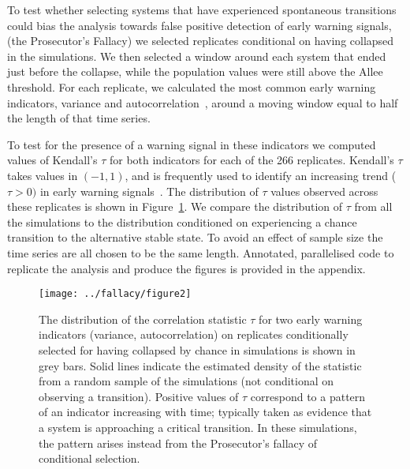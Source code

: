 To test whether selecting systems that have experienced
spontaneous transitions could bias the analysis towards false
positive detection of early warning signals, (the Prosecutor's
Fallacy) we selected replicates conditional on having collapsed
in the simulations.  We then selected a window around each system
that ended just before the collapse, while the population values
were still above the Allee threshold.  For each replicate, we
calculated the most common early warning indicators, variance and
autocorrelation~\citep[\emph{e.g.}][]{Carpenter2006,Dakos2008,Scheffer2009},
around a moving window equal to half the length of that time series.


To test for the presence of a warning signal in these indicators we
computed values of Kendall's $\tau$ for both indicators for each of
the 266 replicates.  Kendall's $\tau$ takes values in $(-1, 1)$, and is
frequently used to identify an increasing trend ($\tau > 0 )$ in early
warning signals~\citep{Dakos2008, Dakos2011}.  The distribution
of $\tau$ values observed across these replicates is shown in
Figure~\ref{fig:indicator}.   
We compare the distribution of $\tau$ from all the simulations to
the distribution conditioned on experiencing a chance transition to the
alternative stable state.  To avoid an effect of sample size the time series are all chosen
to be the same length.  
Annotated, parallelised code to replicate the analysis
and produce the figures is provided in the appendix. 

\begin{figure}
  \begin{center}
    \texttt{[image: ../fallacy/figure2]}
  \end{center}
  \caption{The distribution of the correlation statistic $\tau$ for two
  early warning indicators (variance, autocorrelation) on replicates
  conditionally selected for having collapsed by chance in simulations
  is shown in grey bars.  Solid lines indicate the estimated density of
  the statistic from a random sample of the simulations (not conditional
  on observing a transition). Positive values of $\tau$ correspond to
  a pattern of an indicator increasing with time; typically taken as
  evidence that a system is approaching a critical transition.  In these
  simulations, the pattern arises instead from the Prosecutor's fallacy
  of conditional selection.}
  \label{fig:indicator}
\end{figure}


